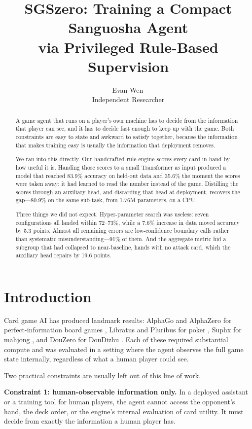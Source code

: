 \documentclass[11pt]{article}
\title{\bf SGSzero: Training a Compact Sanguosha Agent\\ via Privileged Rule-Based Supervision}
\author{
Evan Wen\,\orcidlink{0009-0005-7254-8002}\\
Independent Researcher
}
\date{}
\begin{document}
\maketitle

\begin{abstract}
A game agent that runs on a player's own machine has to decide from the information that player can see, and it has to decide fast enough to keep up with the game. Both constraints are easy to state and awkward to satisfy together, because the information that makes training easy is usually the information that deployment removes.

We ran into this directly. Our handcrafted rule engine scores every card in hand by how useful it is. Handing those scores to a small Transformer as input produced a model that reached 83.9\% accuracy on held-out data and 35.6\% the moment the scores were taken away: it had learned to read the number instead of the game. Distilling the scores through an auxiliary head, and discarding that head at deployment, recovers the gap---80.9\% on the same sub-task, from 1.76M parameters, on a CPU.

Three things we did not expect. Hyper-parameter search was useless: seven configurations all landed within 72--73\%, while a 7.6\% increase in data moved accuracy by 5.3 points. Almost all remaining errors are low-confidence boundary calls rather than systematic misunderstanding---91\% of them. And the aggregate metric hid a subgroup that had collapsed to near-baseline, hands with no attack card, which the auxiliary head repairs by 19.6 points.
\end{abstract}

\section{Introduction}

Card game AI has produced landmark results: AlphaGo and AlphaZero for perfect-information board games \cite{silver2016,silver2018}, Libratus and Pluribus for poker \cite{brown2018,brown2019}, Suphx for mahjong \cite{li2020suphx}, and DouZero for DouDizhu \cite{zha2021douzero}. Each of these required substantial compute and was evaluated in a setting where the agent observes the full game state internally, regardless of what a human player could see.

Two practical constraints are usually left out of this line of work.

\textbf{Constraint 1: human-observable information only.} In a deployed assistant or a training tool for human players, the agent cannot access the opponent's hand, the deck order, or the engine's internal evaluation of card utility. It must decide from exactly the information a human player has.
\end{document}
